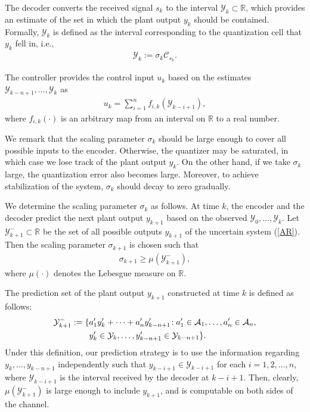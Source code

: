 \documentclass[a4paper, 11pt]{article}
\newcommand{\R}{\mathbb{R}}
\newcommand{\calY}{\mathcal{Y}}
\newcommand{\calA}{\mathcal{A}}
\newcommand{\calC}{\mathcal{C}}
\theoremstyle{definition}
\begin{document}
The decoder converts the received signal $s_k$ to the interval
$\calY_k\subset\R$,
which provides an estimate of the set in which the plant
output $y_k$ should be contained.
Formally, $\calY_k$ is defined as the interval
corresponding to the quantization cell that $y_k$ fell in, i.e.,
\begin{align}
 \calY_k:= \sigma_k\calC_{s_k}. \label{def,calY}
\end{align}

The controller provides the control input $u_k$ based on the estimates
$\calY_{k-n+1},\dots,\calY_{k}$ as
\begin{align}
 u_k=\sum^n_{i=1}f_{i,k}\left(\calY_{k-i+1}\right),\label{controller}
\end{align}
where $f_{i,k}(\cdot)$ is an arbitrary map from an interval on $\R$ to a real number.

We remark that the scaling parameter $\sigma_k$ should be large enough
to cover all possible inputs to the encoder. Otherwise, the quantizer may be
saturated, in which case we lose track of the plant output $y_k$.
On the other hand, if we take $\sigma_k$ large, the quantization error also
becomes large. Moreover, to achieve stabilization of the system, $\sigma_k$
should decay to zero gradually.

We determine the scaling parameter $\sigma_k$ as follows.
At time $k$, the encoder and the decoder predict the next plant output
$y_{k+1}$ based on the observed $\calY_0,\dots,\calY_k$.
Let $\calY_{k+1}^-\subset\R$ be the set of all possible outputs
$y_{k+1}$ of the uncertain system (\ref{AR}).
Then the scaling parameter $\sigma_{k+1}$ is chosen such that
\begin{align}
 \sigma_{k+1}\geq\mu(\calY_{k+1}^-),\label{sigma_ineq}
\end{align}
where $\mu(\cdot)$ denotes the Lebesgue measure on $\R$.

The prediction set of the plant output $y_{k+1}$ constructed at time $k$
is defined as follows:
\begin{align}
  \calY^-_{k+1}:=\{&a_1'y_k'+\cdots+a_n'y_{k-n+1}'\!:
  a_1'\in\calA_1,\dots, a_n'\in\calA_n,\notag\\
  &y_k'\in\calY_{k}, \dots, y_{k-n+1}'\in\calY_{k-n+1}
  \}.\label{def,calY^-}
\end{align}
Under this definition, our prediction strategy is to use the information
regarding $y_k,\dots,y_{k-n+1}$ independently such that $y_{k-i+1}\in\calY_{k-i+1}$
for each $i=1,2,\dots,n$, where $\calY_{k-i+1}$ is the interval received
by the decoder at $k-i+1$.
Then, clearly, $\mu(\calY_{k+1}^-)$ is large enough to include $y_{k+1}$,
and is computable on both sides of the channel.
\end{document}

